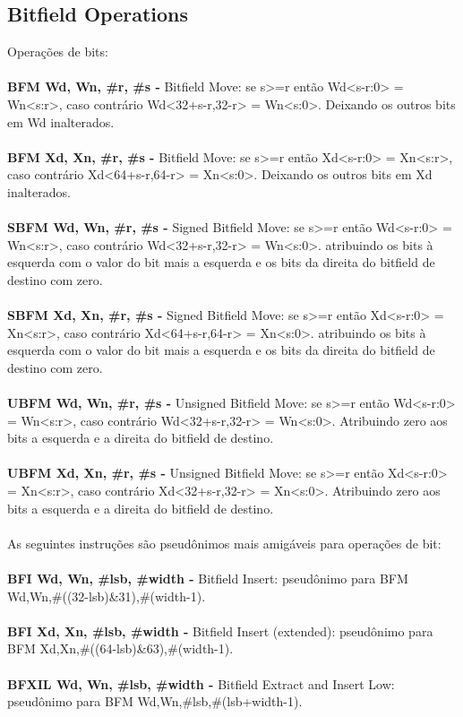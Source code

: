 \documentclass[12pt,a4paper,utf8]{ppgsi}
\begin{document}
\subsection{Bitfield Operations}
Operações de bits:
\\\\\textbf{BFM Wd, Wn, \#r, \#s -} Bitfield Move: se s>=r então Wd<s-r:0> = Wn<s:r>, caso contrário Wd<32+s-r,32-r> = Wn<s:0>. Deixando os outros bits em Wd inalterados.
\\\\\textbf{BFM Xd, Xn, \#r, \#s -} Bitfield Move: se s>=r então Xd<s-r:0> = Xn<s:r>, caso contrário Xd<64+s-r,64-r> = Xn<s:0>. Deixando os outros bits em Xd inalterados.
\\\\\textbf{SBFM Wd, Wn, \#r, \#s -} Signed Bitfield Move: se s>=r então Wd<s-r:0> = Wn<s:r>, caso contrário Wd<32+s-r,32-r> = Wn<s:0>.
atribuindo os bits à esquerda com o valor do bit mais a esquerda e os bits da direita do bitfield de destino com zero.
\\\\\textbf{SBFM Xd, Xn, \#r, \#s -} Signed Bitfield Move: se s>=r então Xd<s-r:0> = Xn<s:r>, caso contrário Xd<64+s-r,64-r> = Xn<s:0>.
atribuindo os bits à esquerda com o valor do bit mais a esquerda e os bits da direita do bitfield de destino com zero.
\\\\\textbf{UBFM Wd, Wn, \#r, \#s -} Unsigned Bitfield Move: se s>=r então Wd<s-r:0> = Wn<s:r>, caso contrário Wd<32+s-r,32-r> = Wn<s:0>.
Atribuindo zero aos bits a esquerda e a direita do bitfield de destino.
\\\\\textbf{UBFM Xd, Xn, \#r, \#s -} Unsigned Bitfield Move: se s>=r então Xd<s-r:0> = Xn<s:r>, caso contrário Xd<32+s-r,32-r> = Xn<s:0>.
Atribuindo zero aos bits a esquerda e a direita do bitfield de destino.
\\\\As seguintes instruções são pseudônimos mais amigáveis para operações de bit:
\\\\\textbf{BFI Wd, Wn, \#lsb, \#width -} Bitfield Insert: pseudônimo para BFM Wd,Wn,\#((32-lsb)\&31),\#(width-1).
\\\\\textbf{BFI Xd, Xn, \#lsb, \#width -} Bitfield Insert (extended): pseudônimo para BFM Xd,Xn,\#((64-lsb)\&63),\#(width-1).
\\\\\textbf{BFXIL Wd, Wn, \#lsb, \#width -} Bitfield Extract and Insert Low: pseudônimo para BFM Wd,Wn,\#lsb,\#(lsb+width-1).
\end{document}
